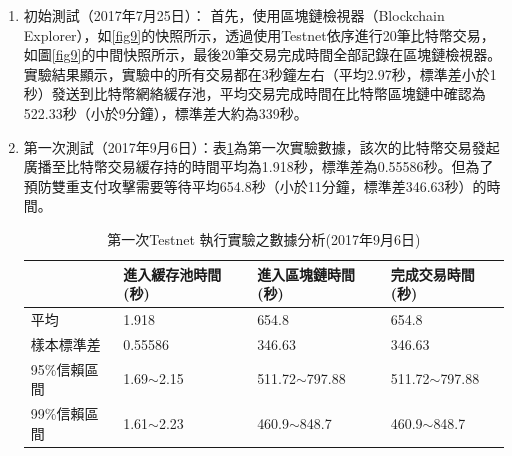 		\begin{enumerate}
			\item 初始測試（2017年7月25日）：
			首先，使用區塊鏈檢視器（Blockchain Explorer）\supercite{Blockchainexplorer:Ananalyticalprocessandinvestigationenvironmentforbitcoin}，如\ref{fig9}的快照所示，透過使用Testnet依序進行20筆比特幣交易，如圖\ref{fig9}的中間快照所示，最後20筆交易完成時間全部記錄在區塊鏈檢視器。實驗結果顯示，實驗中的所有交易都在3秒鐘左右（平均2.97秒，標準差小於1秒）發送到比特幣網絡緩存池，平均交易完成時間在比特幣區塊鏈中確認為522.33秒（小於9分鐘），標準差大約為339秒。

			\item 第一次測試（2017年9月6日）：表\ref{1general}為第一次實驗數據，該次的比特幣交易發起廣播至比特幣交易緩存持的時間平均為1.918秒，標準差為0.55586秒。但為了預防雙重支付攻擊需要等待平均654.8秒（小於11分鐘，標準差346.63秒）的時間。

				\begin{table}[!htbp]
				\centering
				\caption{第一次Testnet 執行實驗之數據分析(2017年9月6日)}
				\label{1general}
				\begin{tabular}{|l|l|l|l|}
				\hline
				 & 進入緩存池時間(秒) & 進入區塊鏈時間(秒) & 完成交易時間(秒) \\ \hline
				平均 & 1.918 & 654.8 & 654.8 \\ \hline
				樣本標準差 & 0.55586 & 346.63 & 346.63 \\ \hline
				95\%信賴區間 & 1.69$\sim$2.15 & 511.72$\sim$797.88 & 511.72$\sim$797.88 \\ \hline
				99\%信賴區間 & 1.61$\sim$2.23 & 460.9$\sim$848.7 & 460.9$\sim$848.7 \\ \hline
				\end{tabular}
				\end{table}


\end{enumerate}
